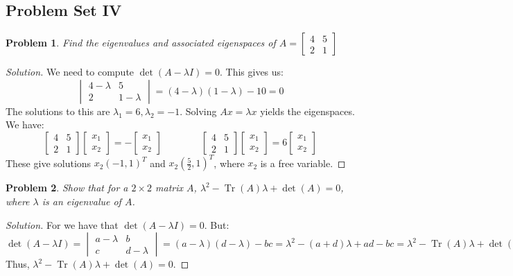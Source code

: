 \documentclass[oneside]{book}
\theoremstyle{mystyle}
\newtheorem{problem}{Problem}[section]
\DeclareMathOperator{\Tr}{Tr}
\begin{document}
\subsection{Problem Set IV}
\begin{problem}
Find the eigenvalues and associated eigenspaces of $A = \begin{bmatrix}4 & 5 \\ 2 & 1 \end{bmatrix}$
\end{problem}
\begin{proof}[Solution]
We need to compute $\det(A-\lambda I)=0$. This gives us:
\begin{equation*}
    \begin{vmatrix} 4-\lambda & 5 \\ 2 & 1-\lambda \end{vmatrix} = (4-\lambda)(1-\lambda)-10 = 0
\end{equation*}
The solutions to this are $\lambda_1 = 6, \lambda_2 = -1$. Solving $Ax = \lambda x$ yields the eigenspaces. We have:
\begin{equation*}
    \begin{bmatrix} 4 & 5 \\ 2 & 1 \end{bmatrix} \begin{bmatrix} x_1 \\ x_2 \end{bmatrix}=-\begin{bmatrix} x_1 \\ x_2 \end{bmatrix}\quad\quad\quad\quad\begin{bmatrix} 4 & 5 \\ 2 & 1 \end{bmatrix} \begin{bmatrix} x_1 \\ x_2 \end{bmatrix}=6\begin{bmatrix} x_1 \\ x_2 \end{bmatrix}
\end{equation*}
These give solutions $x_2(-1,1)^T$ and $x_2 (\frac{5}{2},1)^T$, where $x_2$ is a free variable.
\end{proof}
\begin{problem}
Show that for a $2\times 2$ matrix $A$, $\lambda^2 - \Tr(A)\lambda + \det(A) = 0$, where $\lambda$ is an eigenvalue of $A$.
\end{problem}
\begin{proof}[Solution]
For we have that $\det(A-\lambda I) = 0$. But:
\begin{equation*}
    \det(A-\lambda I)=\begin{vmatrix} a-\lambda & b \\ c & d-\lambda \end{vmatrix}=(a-\lambda)(d-\lambda)-bc=\lambda^2-(a+d)\lambda+ad-bc=\lambda^{2}-\Tr(A)\lambda+\det(A)
\end{equation*}
Thus, $\lambda^2 - \Tr(A) \lambda + \det(A) = 0$.
\end{proof}
\end{document}
